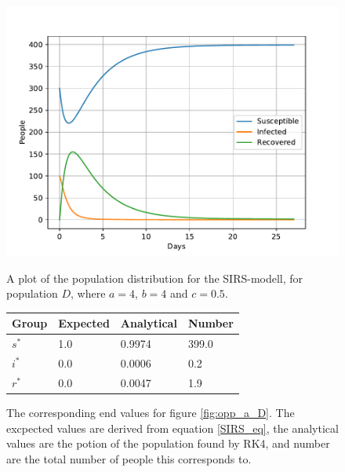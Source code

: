 \documentclass[a4paper]{article}
\begin{document}
\begin{figure}
	\centering
	\begin{minipage}{0.49\textwidth}
		\centering
		\includegraphics[scale=0.6]{../plots/opp_a_D.pdf}
		\caption{A plot of the population distribution for the SIRS-modell, for population $D$, where $a=4$, $b=4$ and $c=0.5$. }\label{fig:opp_a_D}
	\end{minipage}
	\begin{minipage}{0.49\textwidth}
		\centering
		\captionsetup{type=table} %
		\begin{tabular}{|l|l|l|l|}
			\hline
			Group & Expected & Analytical   & Number  \\ \hline
			$s^*$ & 1.0 & 0.9974 & 399.0 \\ \hline
			$i^*$ & 0.0 & 0.0006 & 0.2 \\ \hline
			$r^*$ & 0.0 & 0.0047 & 1.9 \\ \hline
		\end{tabular}
		\caption{The corresponding end values for figure \ref{fig:opp_a_D}. The excpected values are derived from equation \ref{SIRS_eq}, the analytical values are the potion of the population found by RK4, and number are the total number  of people this corresponds to.}\label{tab:opp_a_D}
	\end{minipage}
\end{figure}
\end{document}
